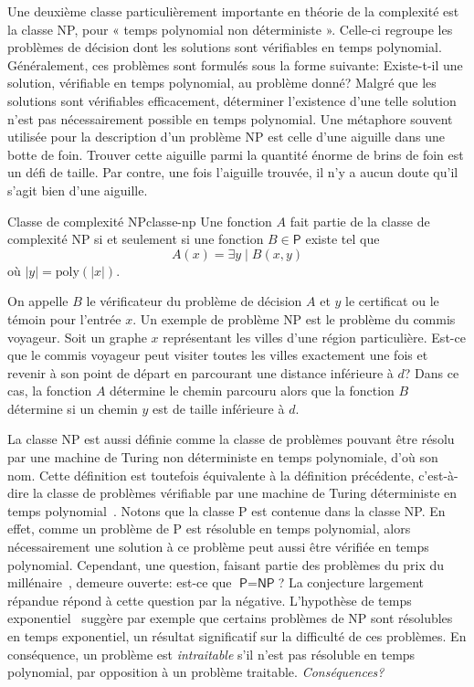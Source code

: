 Une deuxième classe particulièrement importante en théorie de la complexité est la classe \textsf{NP}, pour « temps polynomial non déterministe ». Celle-ci regroupe les problèmes de décision dont les solutions sont vérifiables en temps polynomial. Généralement, ces problèmes sont formulés sous la forme suivante: Existe-t-il une solution, vérifiable en temps polynomial, au problème donné? Malgré que les solutions sont vérifiables efficacement, déterminer l'existence d'une telle solution n'est pas nécessairement possible en temps polynomial. Une métaphore souvent utilisée pour la description d'un problème \textsf{NP} est celle d'une aiguille dans une botte de foin. Trouver cette aiguille parmi la quantité énorme de brins de foin est un défi de taille. Par contre, une fois l'aiguille trouvée, il n'y a aucun doute qu'il s'agit bien d'une aiguille. 

\begin{maindefinition}{Classe de complexité \textsf{NP}}{classe-np}
    Une fonction $A$ fait partie de la classe de complexité \textsf{NP} si et seulement si une fonction $B \in  \textsf{P}$ existe tel que
    \begin{equation*}
        A(x) = \exists y \mid B(x,y)
    \end{equation*}
    où $\lvert y \rvert = \mathrm{poly}(\lvert x \rvert)$.
\end{maindefinition}

On appelle $B$ le vérificateur du problème de décision $A$ et $y$ le certificat ou le témoin pour l'entrée $x$. Un exemple de problème \textsf{NP} est le problème du commis voyageur. Soit un graphe $x$ représentant les villes d'une région particulière. Est-ce que le commis voyageur peut visiter toutes les villes exactement une fois et revenir à son point de départ en parcourant une distance inférieure à $d$? Dans ce cas, la fonction $A$ détermine le chemin parcouru alors que la fonction $B$ détermine si un chemin $y$ est de taille inférieure à $d$.

La classe \textsf{NP} est aussi définie comme la classe de problèmes pouvant être résolu par une machine de Turing non déterministe en temps polynomiale, d'où son nom. Cette définition est toutefois équivalente à la définition précédente, c'est-à-dire la classe de problèmes vérifiable par une machine de Turing déterministe en temps polynomial~\cite{sipserIntroductionTheoryComputation2012}. Notons que la classe \textsf{P} est contenue dans la classe \textsf{NP}. En effet, comme un problème de \textsf{P} est résoluble en temps polynomial, alors nécessairement une solution à ce problème peut aussi être vérifiée en temps polynomial. Cependant, une question, faisant partie des problèmes du prix du millénaire~\cite{carlsonMillenniumPrizeProblems2006}, demeure ouverte: est-ce que $\textsf{P} = \textsf{NP}$? La conjecture largement répandue répond à cette question par la négative. L'hypothèse de temps exponentiel~\cite{impagliazzoComplexityKSAT2001} suggère par exemple que certains problèmes de \textsf{NP} sont résolubles en temps exponentiel, un résultat significatif sur la difficulté de ces problèmes. En conséquence, un problème est \textit{intraitable} s'il n'est pas résoluble en temps polynomial, par opposition à un problème traitable. \textcolor{mydarkred}{\textit{Conséquences?}}

